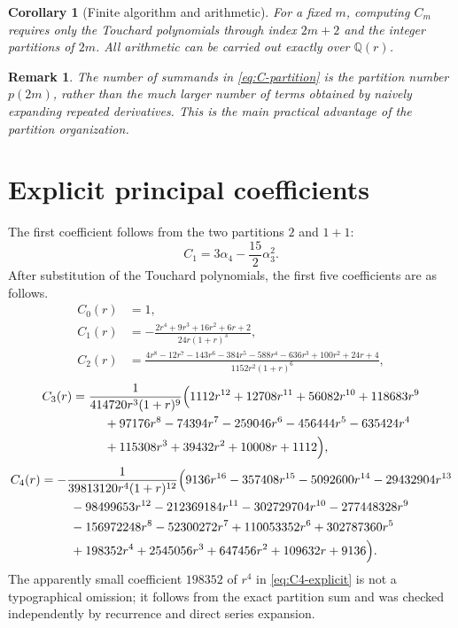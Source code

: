 \documentclass[11pt,a4paper]{article}
\newtheorem{corollary}[theorem]{Corollary}
\newtheorem{remark}[theorem]{Remark}
\theoremstyle{definition}
\begin{document}
\begin{corollary}[Finite algorithm and arithmetic]\label{cor:finite-algorithm}
For a fixed $m$, computing $C_m$ requires only the Touchard polynomials through
index $2m+2$ and the integer partitions of $2m$.  All arithmetic can be carried
out exactly over $\mathbb Q(r)$.
\end{corollary}

\begin{remark}
The number of summands in \eqref{eq:C-partition} is the partition number
$p(2m)$, rather than the much larger number of terms obtained by naively
expanding repeated derivatives.  This is the main practical advantage of the
partition organization.
\end{remark}

\section{Explicit principal coefficients}

The first coefficient follows from the two partitions $2$ and $1+1$:
\begin{equation}\label{eq:C1-alpha}
 C_1=3\alpha_4-\frac{15}{2}\alpha_3^2.
\end{equation}
After substitution of the Touchard polynomials, the first five coefficients
are as follows.
\begin{align}
 C_0(r)&=1,\label{eq:C0-explicit}\\[0.25em]
 C_1(r)&=-\frac{2r^4+9r^3+16r^2+6r+2}
 {24r(1+r)^3},\label{eq:C1-explicit}\\[0.25em]
 C_2(r)&=\frac{
 4r^8-12r^7-143r^6-384r^5-588r^4-636r^3
 +100r^2+24r+4}
 {1152r^2(1+r)^6},\label{eq:C2-explicit}
\end{align}
\begin{align}
 C_3(r)&=\frac{1}{414720r^3(1+r)^9}
 \Bigl(
 1112r^{12}+12708r^{11}+56082r^{10}+118683r^9\notag\\
 &\hspace{2.6em}{}+97176r^8-74394r^7-259046r^6-456444r^5
 -635424r^4\notag\\
 &\hspace{2.6em}{}+115308r^3+39432r^2+10008r+1112
 \Bigr),\label{eq:C3-explicit}
\end{align}
\begin{align}
 C_4(r)&=-\frac{1}{39813120r^4(1+r)^{12}}
 \Bigl(
 9136r^{16}-357408r^{15}-5092600r^{14}-29432904r^{13}\notag\\
 &\hspace{2.4em}{}-98499653r^{12}-212369184r^{11}
 -302729704r^{10}-277448328r^9\notag\\
 &\hspace{2.4em}{}-156972248r^8-52300272r^7+110053352r^6
 +302787360r^5\notag\\
 &\hspace{2.4em}{}+198352r^4+2545056r^3+647456r^2+109632r+9136
 \Bigr).\label{eq:C4-explicit}
\end{align}
The apparently small coefficient $198352$ of $r^4$ in
\eqref{eq:C4-explicit} is not a typographical omission; it follows from the
exact partition sum and was checked independently by recurrence and direct
series expansion.
\end{document}
